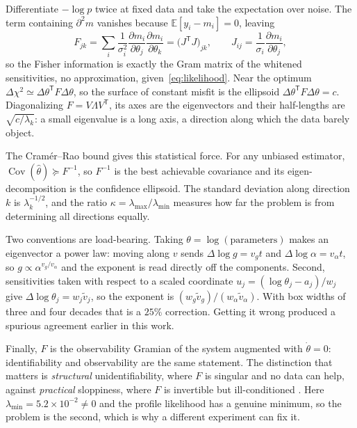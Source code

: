 \documentclass[10pt]{article}
\begin{document}
Differentiate $-\log p$ twice at fixed data and take the expectation over noise. The term
containing $\partial^2 m$ vanishes because $\mathbb{E}[y_i - m_i] = 0$, leaving
%
\begin{equation}
F_{jk} = \sum_i \frac{1}{\sigma_i^2}
  \frac{\partial m_i}{\partial\theta_j}\frac{\partial m_i}{\partial\theta_k}
= \big(J^{\mathsf T}J\big)_{jk},
\qquad
J_{ij} = \frac{1}{\sigma_i}\frac{\partial m_i}{\partial\theta_j},
\label{eq:fisher}
\end{equation}
%
so the Fisher information is exactly the Gram matrix of the whitened sensitivities, no
approximation, given~\eqref{eq:likelihood}. Near the optimum
$\Delta\chi^2 \simeq \Delta\theta^{\mathsf T}F\Delta\theta$, so the surface of constant
misfit is the ellipsoid $\Delta\theta^{\mathsf T}F\Delta\theta = c$. Diagonalizing
$F = V\Lambda V^{\mathsf T}$, its axes are the eigenvectors and their half-lengths are
$\sqrt{c/\lambda_k}$: a small eigenvalue is a long axis, a direction along which the data
barely object.

The Cram\'er--Rao bound gives this statistical force. For any unbiased estimator,
$\operatorname{Cov}(\hat\theta) \succeq F^{-1}$, so $F^{-1}$ is the best achievable
covariance and its eigen-decomposition is the confidence ellipsoid. The standard deviation
along direction $k$ is $\lambda_k^{-1/2}$, and the ratio
$\kappa = \lambda_{\max}/\lambda_{\min}$ measures how far the problem is from determining
all directions equally.

Two conventions are load-bearing. Taking $\theta = \log(\text{parameters})$ makes an
eigenvector a power law: moving along $v$ sends $\Delta\log g = v_g t$ and
$\Delta\log\alpha = v_\alpha t$, so $g \propto \alpha^{v_g/v_\alpha}$ and the exponent is
read directly off the components. Second, sensitivities taken with respect to a scaled
coordinate $u_j = (\log\theta_j - a_j)/w_j$ give $\Delta\log\theta_j = w_j\tilde v_j$, so the
exponent is $(w_g\tilde v_g)/(w_\alpha\tilde v_\alpha)$. With box widths of three and four
decades that is a $25\%$ correction. Getting it wrong produced a spurious agreement earlier
in this work.

Finally, $F$ is the observability Gramian of the system augmented with $\dot\theta = 0$:
identifiability and observability are the same statement. The distinction that matters is
\emph{structural} unidentifiability, where $F$ is singular and no data can help, against
\emph{practical} sloppiness, where $F$ is invertible but ill-conditioned
\citep{raue2009structural,transtrum2014model}. Here
$\lambda_{\min} = 5.2\times10^{-2} \neq 0$ and the profile likelihood has a genuine minimum,
so the problem is the second, which is why a different experiment can fix it.
\end{document}

